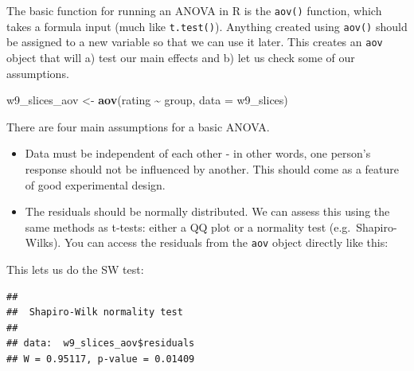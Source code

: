 \documentclass[
]{book}
\newenvironment{Shaded}{\begin{snugshade}}{\end{snugshade}}
\newcommand{\AttributeTok}[1]{\textcolor[rgb]{0.13,0.29,0.53}{#1}}
\newcommand{\FunctionTok}[1]{\textcolor[rgb]{0.13,0.29,0.53}{\textbf{#1}}}
\newcommand{\NormalTok}[1]{#1}
\newcommand{\OtherTok}[1]{\textcolor[rgb]{0.56,0.35,0.01}{#1}}
\newcommand{\SpecialCharTok}[1]{\textcolor[rgb]{0.81,0.36,0.00}{\textbf{#1}}}
\providecommand{\tightlist}{%
  \setlength{\itemsep}{0pt}\setlength{\parskip}{0pt}}
\begin{document}
The basic function for running an ANOVA in R is the \texttt{aov()} function, which takes a formula input (much like \texttt{t.test()}). Anything created using \texttt{aov()} should be assigned to a new variable so that we can use it later. This creates an \texttt{aov} object that will a) test our main effects and b) let us check some of our assumptions.

\begin{Shaded}
\begin{Highlighting}[]
\NormalTok{w9\_slices\_aov }\OtherTok{\textless{}{-}} \FunctionTok{aov}\NormalTok{(rating }\SpecialCharTok{\textasciitilde{}}\NormalTok{ group, }\AttributeTok{data =}\NormalTok{ w9\_slices)}
\end{Highlighting}
\end{Shaded}

There are four main assumptions for a basic ANOVA.

\begin{itemize}
\tightlist
\item
  Data must be independent of each other - in other words, one
  person's response should not be influenced by another. This should
  come as a feature of good experimental design.
\item
  The residuals should be normally distributed. We can assess this
  using the same methods as t-tests: either a QQ plot or a normality
  test (e.g.~Shapiro-Wilks). You can access the residuals from the
  \texttt{aov} object directly like this:
\end{itemize}

\begin{Shaded}
\end{Shaded}

This lets us do the SW test:

\begin{Shaded}
\end{Shaded}

\begin{verbatim}
## 
##  Shapiro-Wilk normality test
## 
## data:  w9_slices_aov$residuals
## W = 0.95117, p-value = 0.01409
\end{verbatim}
\end{document}

